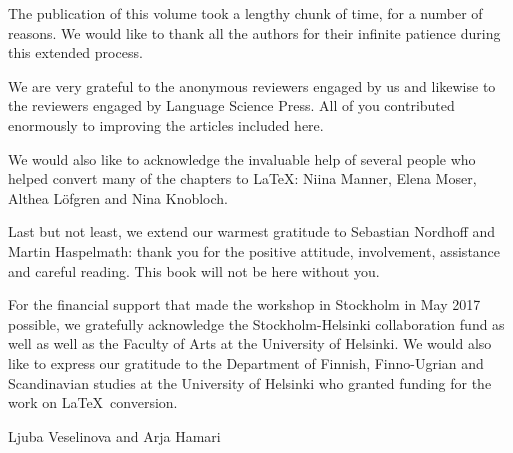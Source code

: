 The publication of this volume took a lengthy chunk of time, for a number of reasons. We would like to thank all the authors for their infinite patience during this extended process.

We are very grateful to the anonymous reviewers engaged by us and likewise to the reviewers engaged by Language Science Press. All of you contributed enormously to improving the articles included here. 

We would also like to acknowledge the invaluable help of several people who helped convert many of the chapters to \LaTeX: Niina Manner, Elena Moser, Althea Löfgren and Nina Knobloch. 

Last but not least, we extend our warmest gratitude to Sebastian Nordhoff and Martin Haspelmath: thank you for the positive attitude, involvement, assistance and careful reading. This book will not be here without you.

For the financial support that made the workshop in Stockholm in May 2017 possible, we gratefully acknowledge the Stockholm-Helsinki collaboration fund as well as well as the Faculty of Arts at the University of Helsinki. We would also like to express our gratitude to the Department of Finnish, Finno-Ugrian and Scandinavian studies at the University of Helsinki who granted funding for the work on \LaTeX\ conversion.

Ljuba Veselinova and Arja Hamari
